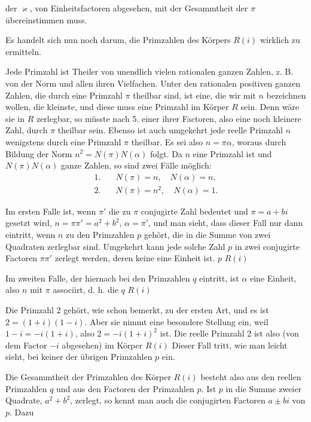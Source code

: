 der $\varkappa$, von Einheitsfactoren abgesehen, mit der Gesammtheit
der $\pi$ übereinstimmen muss.

Es handelt sich nun noch darum, die Primzahlen des
Körpers $R(i)$ wirklich zu ermitteln.

Jede Primzahl ist Theiler von unendlich vielen rationalen
ganzen Zahlen, z. B. von der Norm und allen ihren Vielfachen.
Unter den rationalen positiven ganzen Zahlen, die durch eine Primzahl
 $\pi$ theilbar sind, ist eine, die wir mit $n$ bezeichnen wollen,
die kleinste, und diese muss eine Primzahl im Körper $R$ sein.
Denn wäre sie in $R$ zerlegbar, so müsste nach 5. einer ihrer Factoren,
also eine noch kleinere Zahl, durch $\pi$ theilbar sein. Ebenso
ist auch umgekehrt jede reelle Primzahl $n$ wenigstens durch eine
Primzahl $\pi$ theilbar. Es sei also $n = \pi\alpha$, woraus durch Bildung
der Norm $n^2 = N(\pi)N(\alpha)$ folgt. Da $n$ eine Primzahl ist und
$N(\pi)N(\alpha)$ ganze Zahlen, so sind zwei Fälle möglich:
\[
\begin{aligned}
1.\quad & N(\pi) = n, \quad N(\alpha) = n,\\
2.\quad & N(\pi) = n^2, \quad N(\alpha) = 1.
\end{aligned}
\]

Im ersten Falle ist, wenn $\pi'$ die zu $\pi$ conjugirte Zahl bedeutet
 und $\pi = a+bi$ gesetzt wird, $n = \pi\pi' = a^2+b^2$,
$\alpha = \pi'$, und man sieht, dass dieser Fall nur dann eintritt, wenn
$n$ zu den Primzahlen $p$ gehört, die in die Summe von zwei
Quadraten zerlegbar sind. Umgekehrt kann jede solche Zahl $p$
in zwei conjugirte Factoren $\pi\pi'$ zerlegt werden, deren keine
eine Einheit ist.  $p$ 
$R(i)$ 

Im zweiten Falle, der hiernach bei den Primzahlen $q$ eintritt,
ist $\alpha$ eine Einheit, also $n$ mit $\pi$ associirt, d. h. die  $q$  $R(i)$ 

Die Primzahl 2 gehört, wie schon bemerkt, zu der ersten
Art, und es ist $2 = (1+i)(1-i)$. Aber sie nimmt eine besondere
 Stellung ein, weil $1-i = -i(1+i)$, also $2 = -i(1+i)^2$
ist. Die reelle Primzahl 2 ist also (von dem Factor $-i$ abgesehen)
im Körper $R(i)$  Dieser
Fall tritt, wie man leicht sieht, bei keiner der übrigen Primzahlen
 $p$ ein.

Die Gesammtheit der Primzahlen des Körper $R(i)$ besteht
also aus den reellen Primzahlen $q$ und aus den Factoren der Primzahlen
 $p$. Ist $p$ in die Summe zweier Quadrate, $a^2+b^2$, zerlegt, so
kennt man auch die conjugirten Factoren $a\pm bi$ von $p$. Dazu
